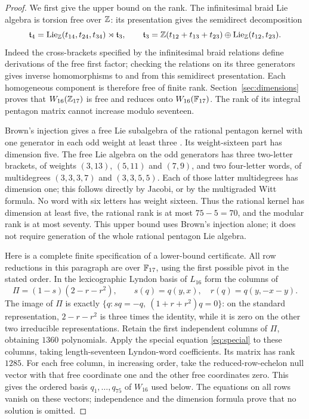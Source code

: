 \begin{proof}
We first give the upper bound on the rank.  The infinitesimal braid Lie
algebra is torsion free over $\mathbb Z$: its presentation gives the semidirect
decomposition
\[
 \mathfrak t_4=\operatorname{Lie}_\mathbb Z(t_{14},t_{24},t_{34})\rtimes\mathfrak t_3,
 \qquad
 \mathfrak t_3=\mathbb Z(t_{12}+t_{13}+t_{23})\oplus
                   \operatorname{Lie}_\mathbb Z(t_{12},t_{23}).
\]
Indeed the cross-brackets specified by the infinitesimal braid relations
define derivations of the free first factor; checking the relations on
its three generators gives inverse homomorphisms to and from this
semidirect presentation.  Each homogeneous component is therefore free
of finite rank.  Section~\ref{sec:dimensions} proves that
$W_{16}(\mathbb Z_{17})$ is free and reduces onto $W_{16}(\mathbb F_{17})$.
The rank of its integral pentagon matrix cannot increase modulo seventeen.

Brown's injection gives a free Lie subalgebra of the rational pentagon
kernel with one generator in each odd weight at least three
\cite[Theorem~1.1 and \S1.1]{Brown}.  Its weight-sixteen part has
dimension five.  The free Lie algebra on the odd
generators has three two-letter brackets, of weights $(3,13)$, $(5,11)$
and $(7,9)$, and two four-letter words, of multidegrees $(3,3,3,7)$
and $(3,3,5,5)$.  Each of those latter multidegrees has dimension one;
this follows directly by Jacobi, or by the multigraded Witt formula.
No word with six letters has weight sixteen.  Thus the rational kernel
has dimension at least five, the rational rank is at most $75-5=70$,
and the modular rank is at most seventy.  This upper bound uses Brown's
injection alone; it does not require generation of the whole rational
pentagon Lie algebra.

Here is a complete finite specification of a lower-bound certificate.
All row reductions in this paragraph are over $\mathbb F_{17}$, using the
first possible pivot in the stated order.  In the lexicographic Lyndon
basis of $L_{16}$ form the columns of
\[
 \Pi=(1-s)(2-r-r^2),\qquad
 s(q)=q(y,x),\quad r(q)=q(y,-x-y).
\]
The image of $\Pi$ is exactly
$\{q:sq=-q,\ (1+r+r^2)q=0\}$: on the standard representation,
$2-r-r^2$ is three times the identity, while it is zero on the other
two irreducible representations.  Retain the first independent columns
of $\Pi$, obtaining $1360$ polynomials.  Apply the special equation
\eqref{eq:special} to these columns, taking length-seventeen Lyndon-word
coefficients.  Its matrix has rank $1285$.  For each free column, in
increasing order, take the reduced-row-echelon null vector with that free
coordinate one and the other free coordinates zero.  This gives the
ordered basis $q_1,\ldots,q_{75}$ of $W_{16}$ used below.  The equations
on all rows vanish on these vectors; independence and the dimension
formula prove that no solution is omitted.


\end{proof}
